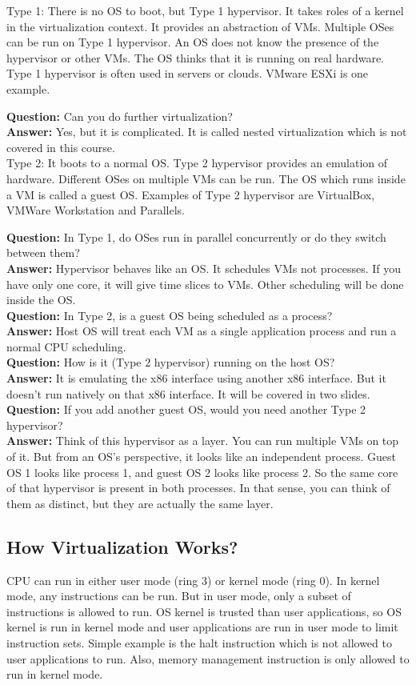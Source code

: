 \documentclass[twoside]{article}
\newcommand{\que}[1]{\textbf{Question:} #1\\}
\newcommand{\ans}[1]{\textbf{Answer:} #1\\}
\begin{document}
Type 1: There is no OS to boot, but Type 1 hypervisor. It takes roles of a kernel in the virtualization context. It provides an abstraction of VMs. Multiple OSes can be run on Type 1 hypervisor. An OS does not know the presence of the hypervisor or other VMs. The OS thinks that it is running on real hardware. Type 1 hypervisor is often used in servers or clouds. VMware ESXi is one example.

\que{Can you do further virtualization?}
\ans{Yes, but it is complicated. It is called nested virtualization which is not covered in this course.}

Type 2: It boots to a normal OS. Type 2 hypervisor provides an emulation of hardware. Different OSes on multiple VMs can be run. The OS which runs inside a VM is called a guest OS. Examples of Type 2 hypervisor are VirtualBox, VMWare Workstation and Parallels.

\que{In Type 1, do OSes run in parallel concurrently or do they switch between them?}
\ans{Hypervisor behaves like an OS. It schedules VMs not processes. If you have only one core, it will give time slices to VMs. Other scheduling will be done inside the OS.}

\que{In Type 2, is a guest OS being scheduled as a process?}
\ans{Host OS will treat each VM as a single application process and run a normal CPU scheduling.}

\que{How is it (Type 2 hypervisor) running on the host OS?}
\ans{It is emulating the x86 interface using another x86 interface. But it doesn't run natively on that x86 interface. It will be covered in two slides.}

\que{If you add another guest OS, would you need another Type 2 hypervisor?}
\ans{Think of this hypervisor as a layer. You can run multiple VMs on top of it. But from an OS's perspective, it looks like an independent process. Guest OS 1 looks like process 1, and guest OS 2 looks like process 2. So the same core of that hypervisor is present in both processes. In that sense, you can think of them as distinct, but they are actually the same layer.}

\subsection{How Virtualization Works?}
CPU can run in either user mode (ring 3) or kernel mode (ring 0). In kernel mode, any instructions can be run. But in user mode, only a subset of instructions is allowed to run. OS kernel is trusted than user applications, so OS kernel is run in kernel mode and user applications are run in user mode to limit instruction sets. Simple example is the halt instruction which is not allowed to user applications to run. Also, memory management instruction is only allowed to run in kernel mode. 
\end{document}
